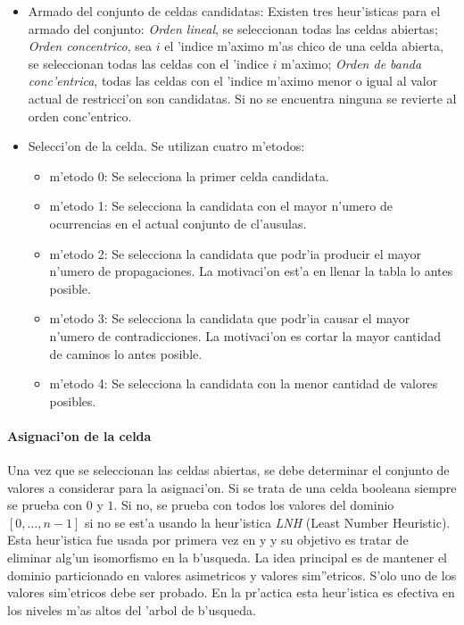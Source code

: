 \begin{itemize}

\item{Armado del conjunto de celdas candidatas}: Existen tres heur'isticas para el armado del conjunto: \textit{Orden lineal}, se seleccionan todas las celdas abiertas; \textit{Orden concentrico}, sea $i$ el 'indice m'aximo m'as chico  de una celda abierta, se seleccionan todas las celdas con el 'indice $i$ m'aximo; \textit{Orden de banda conc'entrica}, todas las celdas con el 'indice m'aximo menor o igual al valor actual de restricci'on son candidatas. Si no se encuentra ninguna se revierte al orden conc'entrico.

\item{Selecci'on de la celda}. Se utilizan cuatro m'etodos:

\begin{itemize}
\item{m'etodo 0}: Se selecciona la primer celda candidata.
\item{m'etodo 1}: Se selecciona la candidata con el mayor n'umero de ocurrencias en el actual conjunto de cl'ausulas.
\item{m'etodo 2}: Se selecciona la candidata que podr'ia producir el mayor n'umero de propagaciones. La motivaci'on est'a en llenar la tabla lo antes posible.
\item{m'etodo 3}: Se selecciona la candidata que podr'ia causar el mayor n'umero de contradicciones. La motivaci'on es cortar la mayor cantidad de caminos lo antes posible.
\item{m'etodo 4}: Se selecciona la candidata con la menor cantidad de valores posibles.
\end{itemize}

\end{itemize}


\paragraph{Asignaci'on de la celda}
Una vez que se seleccionan las celdas abiertas, se debe determinar el conjunto de valores a considerar para la asignaci'on. Si se trata de una celda booleana siempre se prueba con $0$ y $1$. Si no, se prueba con todos los valores del dominio $[0,\dots,n-1]$ si no se est'a usando la heur'istica \textit{LNH} (Least Number Heuristic). Esta heur'istica fue usada por primera vez en \cite{zhang95} y \cite{zhang96} y su objetivo es tratar de eliminar alg'un isomorfismo en la b'usqueda. La idea principal es de mantener el dominio particionado en valores asimetricos y valores sim''etricos. S'olo uno de los valores sim'etricos debe ser probado. En la pr'actica esta heur'istica es efectiva en los niveles m'as altos del 'arbol de b'usqueda.


